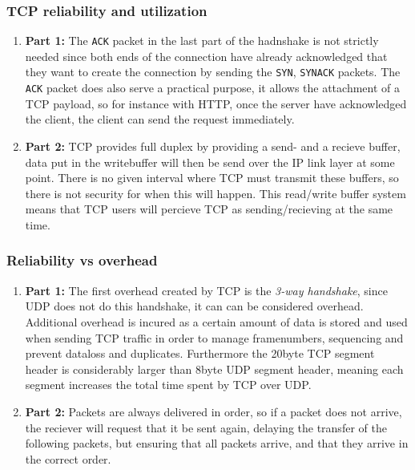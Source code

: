 \documentclass[10pt]{article}
\begin{document}
\subsubsection{TCP reliability and utilization}
\begin{enumerate}
  \item \textbf{Part 1:} The \texttt{ACK} packet in the last part of the
        hadnshake is not strictly needed since both ends of the connection
        have already acknowledged that they want to create the connection by
        sending the \texttt{SYN}, \texttt{SYNACK} packets. The \texttt{ACK}
        packet does also serve a practical purpose, it allows the attachment of
        a TCP payload, so for instance with HTTP, once the server have
        acknowledged the client, the client can send the request immediately.
  \item \textbf{Part 2:} TCP provides full duplex by providing a send- and a
        recieve buffer, data put in the writebuffer will then be send over the
        IP link layer at some point. There is no given interval where TCP must
        transmit these buffers, so there is not security for when this will
        happen. This read/write buffer system means that TCP users will percieve
        TCP as sending/recieving at the same time.
\end{enumerate}

\subsubsection{Reliability vs overhead}
\begin{enumerate}
  \item \textbf{Part 1:} The first overhead created by TCP is the
        \textit{3-way handshake},  since UDP does not do this handshake, it can
        can be considered overhead. Additional overhead is incured as a certain
        amount of data is stored and used when sending TCP traffic in order to
        manage framenumbers, sequencing and prevent dataloss and duplicates.
        Furthermore the 20byte TCP segment header is considerably larger than
        8byte UDP segment header, meaning each segment increases the total time
        spent by TCP over UDP.
  \item \textbf{Part 2:} Packets are always delivered in order, so if a packet
        does not arrive, the reciever will request that it be sent again,
        delaying the transfer of the following packets, but ensuring that all
        packets arrive, and that they arrive in the correct order.
\end{enumerate}
\end{document}
